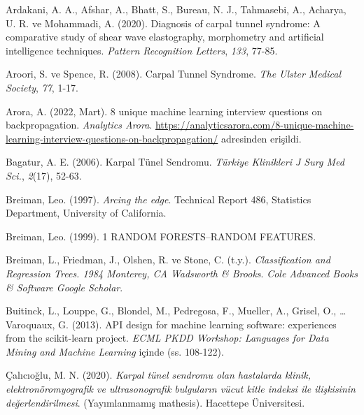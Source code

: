 \documentclass[12pt,twoside]{deuthesis}
\begin{document}
\hypertarget{refs}{}
\begin{CSLReferences}{1}{0}
\leavevmode{}%
Ardakani, A. A., Afshar, A., Bhatt, S., Bureau, N. J., Tahmasebi, A., Acharya, U. R. ve Mohammadi, A. (2020). Diagnosis of carpal tunnel syndrome: A comparative study of shear wave elastography, morphometry and artificial intelligence techniques. \emph{Pattern Recognition Letters}, \emph{133}, 77-85.

\leavevmode{}%
Aroori, S. ve Spence, R. (2008). Carpal Tunnel Syndrome. \emph{The Ulster Medical Society}, \emph{77}, 1-17.

\leavevmode{}%
Arora, A. (2022, Mart). 8 unique machine learning interview questions on backpropagation. \emph{Analytics Arora}. \url{https://analyticsarora.com/8-unique-machine-learning-interview-questions-on-backpropagation/} adresinden erişildi.

\leavevmode{}%
Bagatur, A. E. (2006). Karpal Tünel Sendromu. \emph{Türkiye Klinikleri J Surg Med Sci.}, \emph{2}(17), 52-63.

\leavevmode{}%
Breiman, Leo. (1997). \emph{Arcing the edge}. Technical Report 486, Statistics Department, University of California.

\leavevmode{}%
Breiman, Leo. (1999). 1 RANDOM FORESTS--RANDOM FEATURES.

\leavevmode{}%
Breiman, L., Friedman, J., Olshen, R. ve Stone, C. (t.y.). \emph{Classification and Regression Trees. 1984 Monterey, CA Wadsworth \& Brooks}. \emph{Cole Advanced Books \& Software Google Scholar}.

\leavevmode{}%
Buitinck, L., Louppe, G., Blondel, M., Pedregosa, F., Mueller, A., Grisel, O., \ldots{} Varoquaux, G. (2013). {API} design for machine learning software: experiences from the scikit-learn project. \emph{ECML PKDD Workshop: Languages for Data Mining and Machine Learning} içinde (ss. 108-122).

\leavevmode{}%
Çalıcıoğlu, M. N. (2020). \emph{Karpal tünel sendromu olan hastalarda klinik, elektronöromyografik ve ultrasonografik bulguların vücut kitle indeksi ile ilişkisinin değerlendirilmesi}. (Yayımlanmamış mathesis). Hacettepe Üniversitesi.


\end{CSLReferences}
\end{document}
